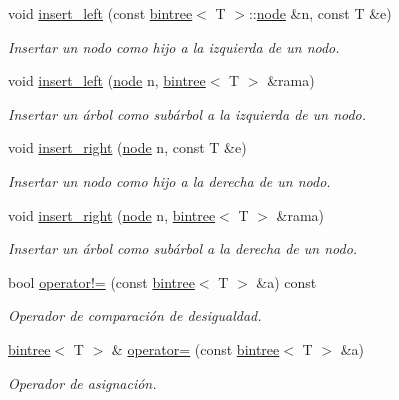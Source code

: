 \begin{DoxyCompactItemize}
\item 
void \hyperlink{classbintree_a49d681962f17c3ef0b63ddd529d15e6a}{insert\+\_\+left} (const \hyperlink{classbintree}{bintree}$<$ T $>$\+::\hyperlink{classbintree_1_1node}{node} \&n, const T \&e)
\begin{DoxyCompactList}\small\item\em Insertar un nodo como hijo a la izquierda de un nodo. \end{DoxyCompactList}\item 
void \hyperlink{classbintree_a17611b995af1d5421197d155e75e683f}{insert\+\_\+left} (\hyperlink{classbintree_1_1node}{node} n, \hyperlink{classbintree}{bintree}$<$ T $>$ \&rama)
\begin{DoxyCompactList}\small\item\em Insertar un árbol como subárbol a la izquierda de un nodo. \end{DoxyCompactList}\item 
void \hyperlink{classbintree_a8f25464ce656370a6ab5d56ac56a3b5e}{insert\+\_\+right} (\hyperlink{classbintree_1_1node}{node} n, const T \&e)
\begin{DoxyCompactList}\small\item\em Insertar un nodo como hijo a la derecha de un nodo. \end{DoxyCompactList}\item 
void \hyperlink{classbintree_a01c798112c64624e3e90ed027bfd76e1}{insert\+\_\+right} (\hyperlink{classbintree_1_1node}{node} n, \hyperlink{classbintree}{bintree}$<$ T $>$ \&rama)
\begin{DoxyCompactList}\small\item\em Insertar un árbol como subárbol a la derecha de un nodo. \end{DoxyCompactList}\item 
bool \hyperlink{classbintree_a80e397f887ebad1ef974ec7722430a6c}{operator!=} (const \hyperlink{classbintree}{bintree}$<$ T $>$ \&a) const 
\begin{DoxyCompactList}\small\item\em Operador de comparación de desigualdad. \end{DoxyCompactList}\item 
\hyperlink{classbintree}{bintree}$<$ T $>$ \& \hyperlink{classbintree_a188622dd3846630d2f69b11a2eba3896}{operator=} (const \hyperlink{classbintree}{bintree}$<$ T $>$ \&a)
\begin{DoxyCompactList}\small\item\em Operador de asignación. \end{DoxyCompactList}\item 

\end{DoxyCompactItemize}
